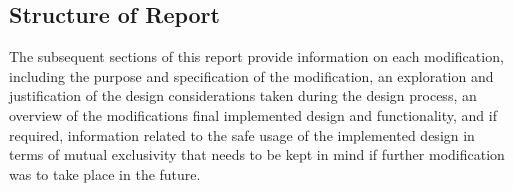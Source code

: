 \subsection{Structure of Report}
The subsequent sections of this report provide information on each modification, including the purpose and specification of the modification, an exploration and justification of the design considerations taken during the design process, an overview of the modifications final implemented design and functionality, and if required, information related to the safe usage of the implemented design in terms of mutual exclusivity that needs to be kept in mind if further modification was to take place in the future.